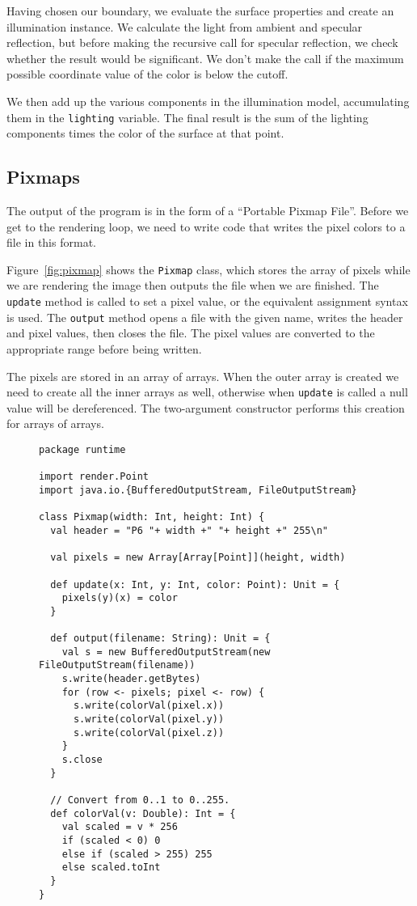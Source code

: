 Having chosen our boundary,
we evaluate the surface properties and create an illumination instance.
We calculate the light from ambient and specular reflection,
but before making the recursive call for specular reflection,
we check whether the result would be significant.
We don't make the call if the maximum possible coordinate value of the color
is below the cutoff.

We then add up the various components in the illumination model,
accumulating them in the \verb!lighting! variable.
The final result is the sum of the lighting components
times the color of the surface at that point.


\subsection{Pixmaps\label{sec:pixmap}}

The output of the program is in the form of a ``Portable Pixmap File''.
Before we get to the rendering loop,
we need to write code that writes the pixel colors
to a file in this format.

Figure~\ref{fig:pixmap} shows the \verb!Pixmap! class,
which stores the array of pixels while we are rendering the image
then outputs the file when we are finished.
The \verb!update! method is called to set a pixel value,
or the equivalent assignment syntax is used.
The \verb!output! method opens a file with the given name,
writes the header and pixel values,
then closes the file.
The pixel values are converted to the appropriate range before being written.

The pixels are stored in an array of arrays.
When the outer array is created we need to create all the inner arrays as well,
otherwise when \verb!update! is called a null value will be dereferenced.
The two-argument constructor performs this creation for arrays of arrays.

\begin{figure}
\begin{verbatim}
package runtime

import render.Point
import java.io.{BufferedOutputStream, FileOutputStream}

class Pixmap(width: Int, height: Int) {
  val header = "P6 "+ width +" "+ height +" 255\n"

  val pixels = new Array[Array[Point]](height, width)

  def update(x: Int, y: Int, color: Point): Unit = {
    pixels(y)(x) = color
  }

  def output(filename: String): Unit = {
    val s = new BufferedOutputStream(new FileOutputStream(filename))
    s.write(header.getBytes)
    for (row <- pixels; pixel <- row) {
      s.write(colorVal(pixel.x))
      s.write(colorVal(pixel.y))
      s.write(colorVal(pixel.z))
    }
    s.close
  }

  // Convert from 0..1 to 0..255.
  def colorVal(v: Double): Int = {
    val scaled = v * 256
    if (scaled < 0) 0
    else if (scaled > 255) 255
    else scaled.toInt
  }
}
\end{verbatim}
\getcaption
\end{figure}


